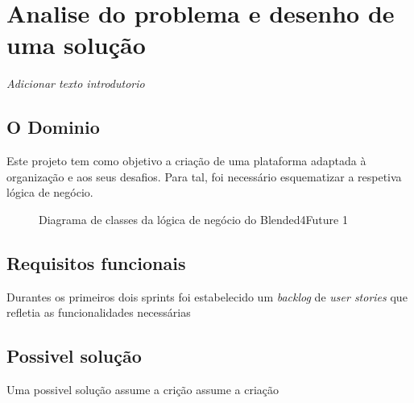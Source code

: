\chapter{Analise do problema e desenho de uma solução}
\label{chap:analisedoproblema}

\textit{Adicionar texto introdutorio}

\section{O Dominio}

Este projeto tem como objetivo a criação de uma plataforma adaptada à organização e aos seus desafios. Para tal, foi necessário esquematizar a respetiva lógica de negócio.

\begin{figure}
\graphicspath{{capitulos/cap3-analisedoproblema/assets/entity-diagram/cd}}
\caption{Diagrama de classes da lógica de negócio do Blended4Future 1}
\label{fig:cd}
\end{figure}



\section{Requisitos funcionais}

Durantes os primeiros dois sprints foi estabelecido um \textit{backlog} de \textit{user stories} que refletia as funcionalidades necessárias

\section{Possivel solução}

Uma possivel solução assume a crição assume a criação 